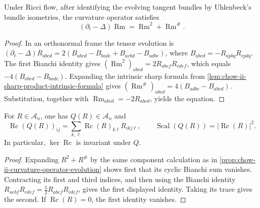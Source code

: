\begin{proposition}
  \label{prop:chow-ii-curvature-operator-evolution}
  Under Ricci flow, after identifying the evolving tangent bundles by
  Uhlenbeck's bundle isometries, the curvature operator satisfies
  \[
    (\partial_t-\Delta)\operatorname{Rm}
       =\operatorname{Rm}^2+\operatorname{Rm}^\#.
  \]
\end{proposition}
\begin{proof}
  In an orthonormal frame the tensor evolution is
  \((\partial_t-\Delta)R_{abcd}
  =2(B_{abcd}-B_{badc}+B_{acbd}-B_{adbc})\), where
  \(B_{abcd}=-R_{apbq}R_{cpdq}\).  The first Bianchi identity gives
  \((\operatorname{Rm}^2)_{abcd}=2R_{abef}R_{cdef}\), which equals
  \(-4(B_{abcd}-B_{badc})\).  Expanding the intrinsic sharp formula from
  \ref{lem:chow-ii-sharp-product-intrinsic-formula} gives
  \((\operatorname{Rm}^\#)_{abcd}=4(B_{adbc}-B_{abcd})\).  Substitution,
  together with \(\operatorname{Rm}_{abcd}=-2R_{abcd}\), yields the equation.
\end{proof}

\begin{corollary}
  \label{cor:chow-ii-curvature-quadratic-trace}
  For \(R\in\mathcal A_n\), one has \(Q(R)\in\mathcal A_n\) and
  \[
    \operatorname{Rc}(Q(R))_{ij}
      =\sum_{k,\ell}\operatorname{Rc}(R)_{k\ell}R_{ikj\ell},
    \qquad
    \operatorname{Scal}(Q(R))=|\operatorname{Rc}(R)|^2.
  \]
  In particular, \(\ker\operatorname{Rc}\) is invariant under \(Q\).
\end{corollary}
\begin{proof}
  Expanding \(R^2+R^\#\) by the same component calculation as in
  \ref{prop:chow-ii-curvature-operator-evolution} shows first that its cyclic
  Bianchi sum vanishes.  Contracting its first and third indices, and then
  using the Bianchi identity
  \(R_{aebf}R_{cdef}=\tfrac12R_{abef}R_{cdef}\), gives the first displayed
  identity.  Taking its trace gives the second.  If \(\operatorname{Rc}(R)=0\),
  the first identity vanishes.
\end{proof}


